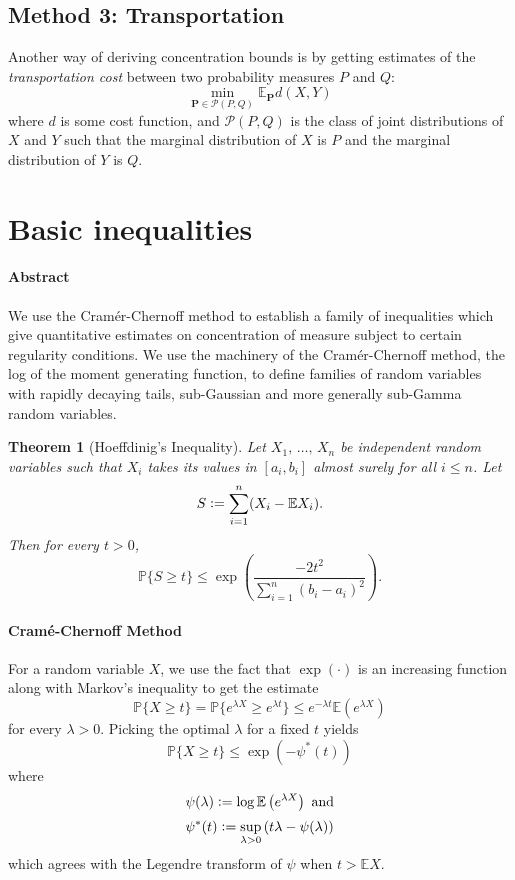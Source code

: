 \documentclass{amsproc}
\newtheorem{theorem}{Theorem}
\newcommand{\defeq}{\vcentcolon=} %
\renewcommand{\P}{\mathbb{P}} %
\newcommand{\E}{\mathbb{E}} %
\begin{document}
\subsection*{Method 3: Transportation}
\label{sec:transport_method}
	Another way of deriving concentration bounds is by getting estimates of the \textit{transportation cost} between two probability measures $P$ and $Q$:
	\[
		\min_{\mathbf{P}\in\mathcal{P}(P,Q)} \E_\mathbf{P}d(X,Y)
	\]
	where $d$ is some cost function, and $\mathcal{P}(P,Q)$ is the class of joint distributions of $X$ and $Y$ such that the marginal distribution of $X$ is $P$ and the marginal distribution of $Y$ is $Q$.


\section{Basic inequalities}
\label{sec:basic_inequalites}
\paragraph{\textbf{Abstract}}
	We use the Cram\'{e}r-Chernoff method to establish a family of inequalities which give quantitative estimates on concentration of measure subject to certain regularity conditions. We use the machinery of the Cram\'{e}r-Chernoff method, the log of the moment generating function, to define families of random variables with rapidly decaying tails, sub-Gaussian and more generally sub-Gamma random variables.

\begin{theorem}[Hoeffdinig's Inequality]
\label{thm:hoeffding}
	Let $X_1,\, \dots,\, X_n$ be independent random variables such that $X_i$ takes its values in $[a_i, b_i]$ almost surely for all $i \leq n$. Let
	\[S \defeq \sum_{i=1}^n (X_i - \E X_i).\]
	Then for every $t > 0$,
	\[\P \{S \geq t \} \leq  \exp \left( \frac{-2t^2}{\sum_{i=1}^n (b_i-a_i)^2} \right).\]
\end{theorem}

\paragraph{\textbf{Cram\'{e}-Chernoff Method}}
\label{rmk:cramer_chernoff}
	For a random variable $X$, we use the fact that $\exp(\cdot)$ is an increasing function along with Markov's inequality to get the estimate
	\[\P \{X \geq t \} = \P \{e^{\lambda X} \geq e^{\lambda t} \} \leq e^{-\lambda t} \E \left( e^{\lambda X} \right)\]
	for every $\lambda > 0$.
	Picking the optimal $\lambda$ for a fixed $t$ yields
	\[\P \{X \geq t \} \leq \exp \left( -\psi^*(t) \right) \]
	where 
	\[\psi(\lambda) \defeq \log \E \left( e^{\lambda X} \right) \text{ and}\]
	\[\psi^*(t) \defeq \sup_{\lambda > 0} \left( t \lambda - \psi(\lambda) \right) \]
	which agrees with the Legendre transform of $\psi$ when $t > \E X$.
\end{document}
